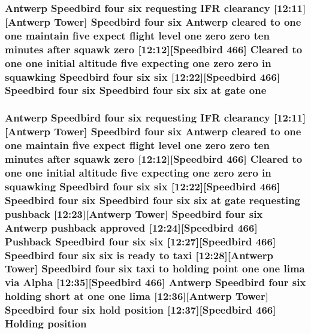 \subsubsection[{\texorpdfstring{one}{one}}]{\setlength{\rightskip}{0pt plus 5cm}Antwerp Speedbird four {\bf six} requesting I\+FR clearancy \mbox{[}12\+:11\mbox{]}\mbox{[}Antwerp {\bf Tower}\mbox{]} Speedbird four {\bf six} Antwerp cleared to one one maintain five expect flight level one {\bf zero} {\bf zero} {\bf ten} minutes after squawk {\bf zero} \mbox{[}12\+:12\mbox{]}\mbox{[}Speedbird 466\mbox{]} Cleared to one one initial altitude five expecting one {\bf zero} {\bf zero} in {\bf squawking} Speedbird four {\bf six} {\bf six} \mbox{[}12\+:22\mbox{]}\mbox{[}Speedbird 466\mbox{]} Speedbird four {\bf six} Speedbird four {\bf six} {\bf six} at gate one}\hypertarget{happyDay5ATC_8txt_a1bdf675837626f29e859d1a241701d26}{}\label{happyDay5ATC_8txt_a1bdf675837626f29e859d1a241701d26}
\subsubsection[{\texorpdfstring{position}{position}}]{\setlength{\rightskip}{0pt plus 5cm}Antwerp Speedbird four {\bf six} requesting I\+FR clearancy \mbox{[}12\+:11\mbox{]}\mbox{[}Antwerp {\bf Tower}\mbox{]} Speedbird four {\bf six} Antwerp cleared to {\bf one} {\bf one} maintain five expect flight level {\bf one} {\bf zero} {\bf zero} {\bf ten} minutes after squawk {\bf zero} \mbox{[}12\+:12\mbox{]}\mbox{[}Speedbird 466\mbox{]} Cleared to {\bf one} {\bf one} initial altitude five expecting {\bf one} {\bf zero} {\bf zero} in {\bf squawking} Speedbird four {\bf six} {\bf six} \mbox{[}12\+:22\mbox{]}\mbox{[}Speedbird 466\mbox{]} Speedbird four {\bf six} Speedbird four {\bf six} {\bf six} at gate requesting pushback \mbox{[}12\+:23\mbox{]}\mbox{[}Antwerp {\bf Tower}\mbox{]} Speedbird four {\bf six} Antwerp pushback {\bf approved} \mbox{[}12\+:24\mbox{]}\mbox{[}Speedbird 466\mbox{]} Pushback Speedbird four {\bf six} {\bf six} \mbox{[}12\+:27\mbox{]}\mbox{[}Speedbird 466\mbox{]} Speedbird four {\bf six} {\bf six} is ready to taxi \mbox{[}12\+:28\mbox{]}\mbox{[}Antwerp {\bf Tower}\mbox{]} Speedbird four {\bf six} taxi to holding point {\bf one} {\bf one} {\bf lima} via {\bf Alpha} \mbox{[}12\+:35\mbox{]}\mbox{[}Speedbird 466\mbox{]} Antwerp Speedbird four {\bf six} holding short at {\bf one} {\bf one} {\bf lima} \mbox{[}12\+:36\mbox{]}\mbox{[}Antwerp {\bf Tower}\mbox{]} Speedbird four {\bf six} hold position \mbox{[}12\+:37\mbox{]}\mbox{[}Speedbird 466\mbox{]} Holding position}\hypertarget{happyDay5ATC_8txt_a6e8fa6f42e46ea0173f11b458c8b1193}{}\label{happyDay5ATC_8txt_a6e8fa6f42e46ea0173f11b458c8b1193}
